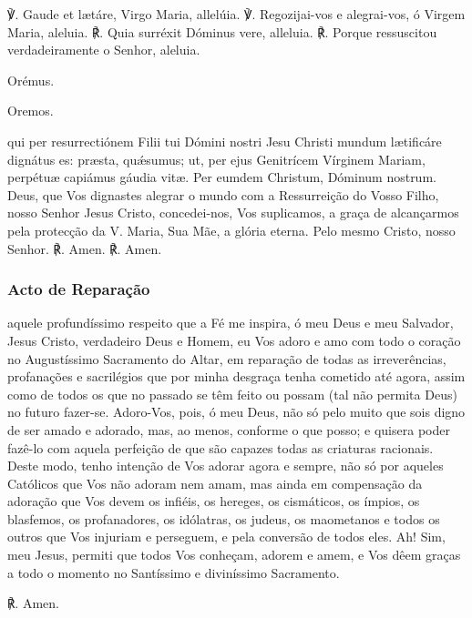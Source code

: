 \begin{nscenter}\emph{}\end{nscenter}

\begin{paracol}{2}
℣. Gaude et lætáre, Virgo Maria, allelúia.
\switchcolumn
℣. Regozijai-vos e alegrai-vos, ó Virgem Maria, aleluia.
\switchcolumn*
℟. Quia surréxit Dóminus vere, alleluia.
\switchcolumn
℟. Porque ressuscitou verdadeiramente o Senhor, aleluia.
\switchcolumn*
\begin{nscenter} {\redx Orémus.} \end{nscenter}
\switchcolumn
\begin{nscenter} {\redx Oremos.} \end{nscenter}
\switchcolumn*
{} qui per resurrectiónem Filii tui Dómini nostri Jesu Christi mundum lætificáre dignátus es: præsta, quǽsumus; ut, per ejus Genitrícem Vírginem Mariam, perpétuæ capiámus gáudia vitæ. Per eumdem Christum, Dóminum nostrum.
\switchcolumn
{} Deus, que Vos dignastes alegrar o mundo com a Ressurreição do Vosso Filho, nosso Senhor Jesus Cristo, concedei-nos, Vos suplicamos, a graça de alcançarmos pela protecção da V. Maria, Sua Mãe, a glória eterna. Pelo mesmo Cristo, nosso Senhor.
\switchcolumn*
℟. Amen.
\switchcolumn
℟. Amen.
\end{paracol}

\subsubsection{Acto de Reparação}

 aquele profundíssimo respeito que a Fé me inspira, ó meu Deus e meu Salvador, Jesus Cristo, verdadeiro Deus e Homem, eu Vos adoro e amo com todo o coração no Augustíssimo Sacramento do Altar, em reparação de todas as irreverências, profanações e sacrilégios que por minha desgraça tenha cometido até agora, assim como de todos os que no passado se têm feito ou possam (tal não permita Deus) no futuro fazer-se. Adoro-Vos, pois, ó meu Deus, não só pelo muito que sois digno de ser amado e adorado, mas, ao menos, conforme o que posso; e quisera poder fazê-lo com aquela perfeição de que são capazes todas as criaturas racionais. Deste modo, tenho intenção de Vos adorar agora e sempre, não só por aqueles Católicos que Vos não adoram nem amam, mas ainda em compensação da adoração que Vos devem os infiéis, os hereges, os cismáticos, os ímpios, os blasfemos, os profanadores, os idólatras, os judeus, os maometanos e todos os outros que Vos injuriam e perseguem, e pela conversão de todos eles. Ah! Sim, meu Jesus, permiti que todos Vos conheçam, adorem e amem, e Vos dêem graças a todo o momento no Santíssimo e diviníssimo Sacramento. \par
℟. Amen.

